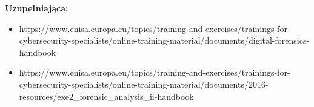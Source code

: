 \documentclass[12pt, a4paper]{article}
\begin{document}
\textbf{Uzupełniająca:}
\begin{itemize}
  \item https://www.enisa.europa.eu/topics/training-and-exercises/trainings-for-cybersecurity-specialists/online-training-material/documents/digital-forensics-handbook
  \item https://www.enisa.europa.eu/topics/training-and-exercises/trainings-for-cybersecurity-specialists/online-training-material/documents/2016-resources/exe2\_forensic\_analysis\_ii-handbook
\end{itemize}
\end{document}
